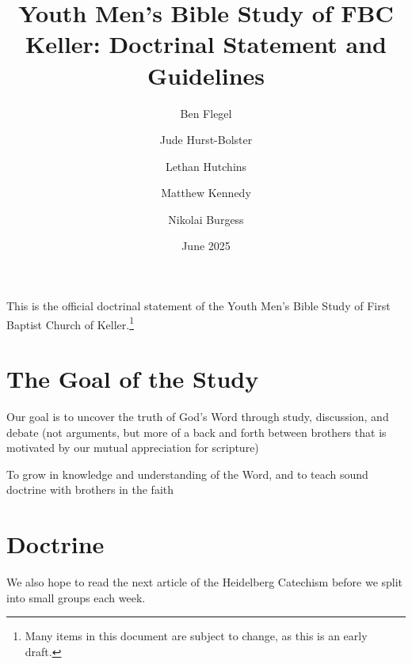 \documentclass[12pt]{article}
\title{Youth Men's Bible Study of FBC Keller: Doctrinal Statement and Guidelines}
\author{Ben Flegel \and Jude Hurst-Bolster \and Lethan Hutchins \and Matthew
Kennedy \and Nikolai Burgess }
\date{June 2025}
\begin{document}
\maketitle{}





  This is the official doctrinal statement of the Youth Men's Bible Study of
First Baptist Church of Keller.\footnote{Many items in this document are subject
to change, as this is an early draft.}

\section{The Goal of the Study}

  Our goal is to uncover the truth of God's Word through study, discussion, and
debate (not arguments, but more of a back and forth between brothers that is
motivated by our mutual appreciation for scripture)

To grow in knowledge and understanding of the Word, and to teach sound doctrine
with brothers in the faith



\section{Doctrine}



  We also hope to read the next article of the Heidelberg Catechism before we
split into small groups each week.
\end{document}
